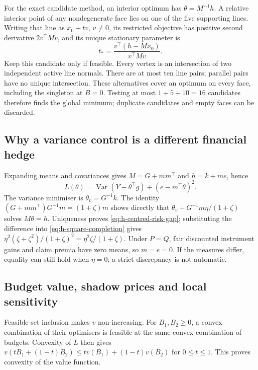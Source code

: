 \documentclass[11pt]{article}
\begin{document}
For the exact candidate method, an interior optimum has
$\theta=M^{-1}h$. A relative interior point of any nondegenerate face
lies on one of the five supporting lines. Writing that line as
$x_0+tv$, $v\ne0$, its restricted objective has positive second
derivative $2v^\top Mv$, and its unique stationary parameter is
\begin{equation}
 t_*=\frac{v^\top(h-Mx_0)}{v^\top Mv}.
 \label{eq:h-face-stationary}
\end{equation}
Keep this candidate only if feasible. Every vertex is an intersection
of two independent active line normals. There are at most ten line
pairs; parallel pairs have no unique intersection. These alternatives
cover an optimum on every face, including the singleton at $B=0$.
Testing at most $1+5+10=16$ candidates therefore finds the global
minimum; duplicate candidates and empty faces can be discarded.

\subsection{Why a variance control is a different financial hedge}

Expanding means and covariances gives $M=G+mm^\top$ and
$h=k+me$, hence
\begin{equation}
 L(\theta)=\operatorname{Var}(Y-\theta^\top g)
 +(e-m^\top\theta)^2.
 \label{eq:h-mean-variance-decomposition}
\end{equation}
The variance minimiser is $\theta_v=G^{-1}k$. The identity
$(G+mm^\top)G^{-1}m=(1+\zeta)m$ shows directly that
$\theta_v+G^{-1}m\eta/(1+\zeta)$ solves $M\theta=h$.
Uniqueness proves \eqref{eq:h-centred-risk-gap}; substituting the
difference into \eqref{eq:h-square-completion} gives
$\eta^2(\zeta+\zeta^2)/(1+\zeta)^2=\eta^2\zeta/(1+\zeta)$.
Under $P=Q$, fair discounted instrument gains and claim premia have
zero means, so $m=e=0$. If the measures differ, equality can still
hold when $\eta=0$; a strict discrepancy is not automatic.

\subsection{Budget value, shadow prices and local sensitivity}

Feasible-set inclusion makes $v$ non-increasing. For $B_1,B_2\geq0$,
a convex combination of their optimisers is feasible at the same
convex combination of budgets. Convexity of $L$ then gives
$v(tB_1+(1-t)B_2)\leq tv(B_1)+(1-t)v(B_2)$ for $0\leq t\leq1$.
This proves convexity of the value function.
\end{document}
